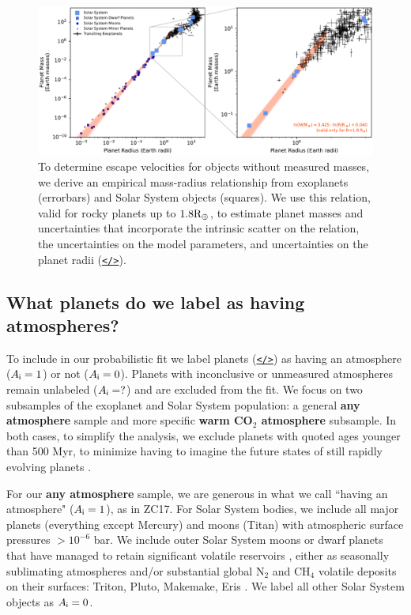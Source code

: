 \documentclass[modern,linenumbers,trackchanges]{aastex7}
\begin{document}
\begin{figure}[ht!]
\includegraphics[width=\textwidth]{figures/mass-radius-relation-for-rocky-planets}
\caption{To determine escape velocities for objects without measured masses, we derive an empirical mass-radius relationship from exoplanets (errorbars) and Solar System objects (squares). We use this relation, valid for rocky planets up to $1.8\rm{R}_\oplus$, to estimate planet masses and uncertainties that incorporate the intrinsic scatter on the relation, the uncertainties on the model parameters, and uncertainties on the planet radii (\href{https://github.com/zkbt/shoreline/blob/main/notebooks/fit-mass-radius-relation.ipynb}{\texttt{</>}}).
}
\label{f:mass-radius}
\end{figure}

\subsection{What planets do we label as having atmospheres?}

To include in our probabilistic fit we label planets (\href{https://github.com/zkbt/shoreline/blob/main/notebooks/curate-and-label-planets.ipynb}{\texttt{</>}}) as having an atmosphere ($A_{\sf i} = 1$) or not ($A_{\sf i} = 0$). Planets with inconclusive or unmeasured atmospheres remain unlabeled ($A_{\sf i} = ?$) and are excluded from the fit. We focus on two subsamples of the exoplanet and Solar System population: a general \textbf{any atmosphere} sample and more specific \textbf{warm CO$_{2}$ atmosphere} subsample. In both cases, to simplify the analysis, we exclude planets with quoted ages younger than 500 Myr, to minimize having to imagine the future states of still rapidly evolving planets \citep{lopezUnderstandingMassRadiusRelation2014a, chenEvolutionaryAnalysisGaseous2016b,  thaoFeatherweightGiantUnraveling2024b}. 

For our {\bf any atmosphere} sample, we are generous in what we call ``having an atmosphere" ($A_{\sf i} = 1$), as in ZC17. For Solar System bodies, we include all major planets (everything except Mercury) and moons (Titan) with atmospheric surface pressures $>10^{-6}$ bar. We include outer Solar System moons or dwarf planets that have managed to retain significant volatile reservoirs \citep{schallerVolatileLossRetention2007}, either as seasonally sublimating atmospheres and/or substantial global N$_2$ and CH$_4$ volatile deposits on their surfaces: Triton, Pluto, Makemake, Eris \citep{youngStructureCompositionPlutos2018, sicardyConstraintsEvolutionTriton2024, grundyModerateRatiosMethane2024}. We label all other Solar System objects as $A_{\sf i} = 0$.
\end{document}
